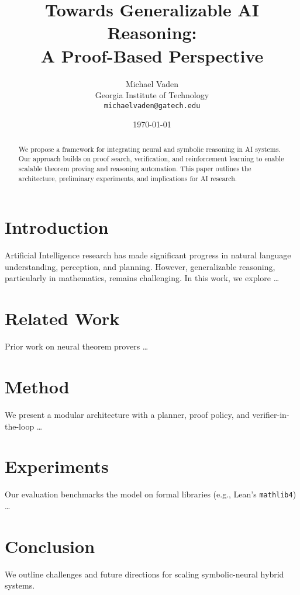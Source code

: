 \documentclass[11pt]{article}
\title{Towards Generalizable AI Reasoning: \\ A Proof-Based Perspective}
\author{
  Michael Vaden \\
  Georgia Institute of Technology \\
  \texttt{michaelvaden@gatech.edu}
}
\date{\today}
\begin{document}
\maketitle

\begin{abstract}
We propose a framework for integrating neural and symbolic reasoning in AI systems. Our approach builds on proof search, verification, and reinforcement learning to enable scalable theorem proving and reasoning automation. This paper outlines the architecture, preliminary experiments, and implications for AI research.
\end{abstract}

\section{Introduction}
Artificial Intelligence research has made significant progress in natural language understanding, perception, and planning. However, generalizable reasoning, particularly in mathematics, remains challenging. In this work, we explore \ldots

\section{Related Work}
Prior work on neural theorem provers \ldots

\section{Method}
We present a modular architecture with a planner, proof policy, and verifier-in-the-loop \ldots

\section{Experiments}
Our evaluation benchmarks the model on formal libraries (e.g., Lean’s \texttt{mathlib4}) \ldots

\section{Conclusion}
We outline challenges and future directions for scaling symbolic-neural hybrid systems.



\end{document}
